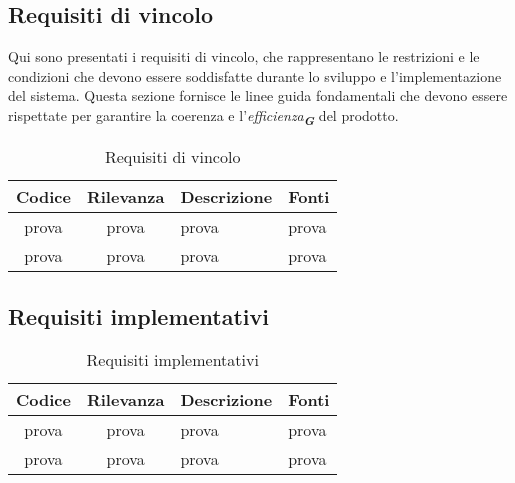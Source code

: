 \subsection{Requisiti di vincolo}
Qui sono presentati i requisiti di vincolo, che rappresentano le restrizioni e le condizioni
che devono essere soddisfatte durante lo sviluppo e l'implementazione del sistema. Questa
sezione fornisce le linee guida fondamentali che devono essere rispettate per garantire la
coerenza e l'\emph{efficienza}\textsubscript{\textit{\textbf{G}}} del prodotto.
\begin{table}[h!]
    \centering
    \renewcommand{\arraystretch}{1.6} %
    \begin{tabularx}{\textwidth}{|>{\centering\arraybackslash}c|>{\centering\arraybackslash}c|>{\centering\arraybackslash}X|>{\centering\arraybackslash}p{3cm}|} \hline
    \rowcolor[HTML]{FFD700} 
    \textbf{Codice} & \textbf{Rilevanza} & \textbf{Descrizione} & \textbf{Fonti} \\ \hline
    prova & prova & prova & prova \\ \hline
    prova & prova & prova & prova \\ \hline
    \end{tabularx}
    \caption{Requisiti di vincolo}
    \label{tab:Requisiti_di_vincolo}
\end{table}

\newpage
\subsection{Requisiti implementativi}
\label{sec:Requisiti_implementativi}
\begin{table}[h!]
    \centering
    \renewcommand{\arraystretch}{1.6} %
    \begin{tabularx}{\textwidth}{|>{\centering\arraybackslash}c|>{\centering\arraybackslash}c|>{\centering\arraybackslash}X|>{\centering\arraybackslash}p{3cm}|} \hline
    \rowcolor[HTML]{FFD700} 
    \textbf{Codice} & \textbf{Rilevanza} & \textbf{Descrizione} & \textbf{Fonti} \\ \hline
    prova & prova & prova & prova \\ \hline
    prova & prova & prova & prova \\ \hline
    \end{tabularx}
    \caption{Requisiti implementativi}
    \label{tab:Requisiti_implementativi}
\end{table}

